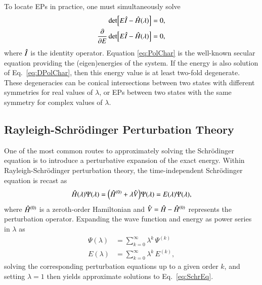 \documentclass[aps,prb,reprint,noshowkeys,linenumbers,superscriptaddress]{revtex4-1}
\newcommand{\hI}{\Hat{I}}
\newcommand{\hH}{\Hat{H}}
\newcommand{\hV}{\Hat{V}}
\begin{document}
To locate EPs in practice, one must simultaneously solve
\begin{subequations}
\begin{align}
	\label{eq:PolChar}
	\det[E\hI-\hH(\lambda)] & = 0,
	\\ 
	\label{eq:DPolChar}
	\pdv{E}\det[E\hI-\hH(\lambda)] & = 0,
\end{align}
\end{subequations}
where $\hI$ is the identity operator.\cite{Cejnar_2007}
Equation \eqref{eq:PolChar} is the well-known secular equation providing the (eigen)energies of the system. 
If the energy is also solution of Eq.~\eqref{eq:DPolChar}, then this energy value is at least two-fold degenerate. 
These degeneracies can be conical intersections between two states with different symmetries 
for real values of $\lambda$,\cite{Yarkony_1996} or EPs between two states with the 
same symmetry for complex values of $\lambda$.


\subsection{Rayleigh-Schr\"odinger Perturbation Theory}

One of the most common routes to approximately solving the Schr\"odinger equation
is to introduce a perturbative expansion of the exact energy.
Within Rayleigh-Schr\"odinger perturbation theory, the time-independent Schr\"odinger equation 
is recast as 
\begin{equation} 
	\hH(\lambda) \Psi(\lambda) 
    = \qty(\hH^{(0)} + \lambda \hV ) \Psi(\lambda) 
    = E(\lambda) \Psi(\lambda),
    \label{eq:SchrEq-PT}
\end{equation}
where $\hH^{(0)}$ is a zeroth-order Hamiltonian and $\hV = \hH - \hH^{(0)}$ represents the perturbation operator.
Expanding the wave function and energy as power series in $\lambda$ as 
\begin{subequations}
\begin{align}
    \Psi(\lambda) &= \sum_{k=0}^{\infty} \lambda^{k}\,\Psi^{(k)} 
    \label{eq:psi_expansion}
    \\
    E(\lambda) &= \sum_{k=0}^{\infty} \lambda^{k}\,E^{(k)},
    \label{eq:E_expansion}
\end{align}
\end{subequations}
solving the corresponding perturbation equations up to a given order $k$, and
setting $\lambda = 1$ then yields approximate solutions to Eq.~\eqref{eq:SchrEq}.
\end{document}
